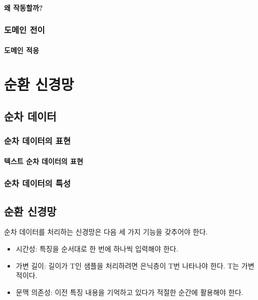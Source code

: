 \documentclass [12pt] {oblivoir}
\let\oldsubsubsection=\subsubsection
\renewcommand{\subsubsection}
{
  \filbreak
  \oldsubsubsection
}
\begin{document}
\vspace{3mm}

\paragraph*{왜 작동할까?}\mbox{}

\vspace{3mm}

\subsubsection{도메인 전이}

\paragraph*{도메인 적응}\mbox{}

\vspace{3mm}

\newpage
\section{순환 신경망}

\subsection{순차 데이터}

\subsubsection{순차 데이터의 표현}

\paragraph*{텍스트 순차 데이터의 표현}\mbox{}

\vspace{3mm}

\subsubsection{순차 데이터의 특성}

\subsection{순환 신경망}

순차 데이터를 처리하는 신경망은 다음 세 가지 기능을 갖추어야 한다.

\begin{itemize}
  \item 시간성: 특징을 순서대로 한 번에 하나씩 입력해야 한다.
  \item 가변 길이: 길이가 T인 샘플을 처리하려면 은닉층이 T번 나타나야 한다. T는 가변적이다.
  \item 문맥 의존성: 이전 특징 내용을 기억하고 있다가 적절한 순간에 활용해야 한다.
\end{itemize}
\end{document}
